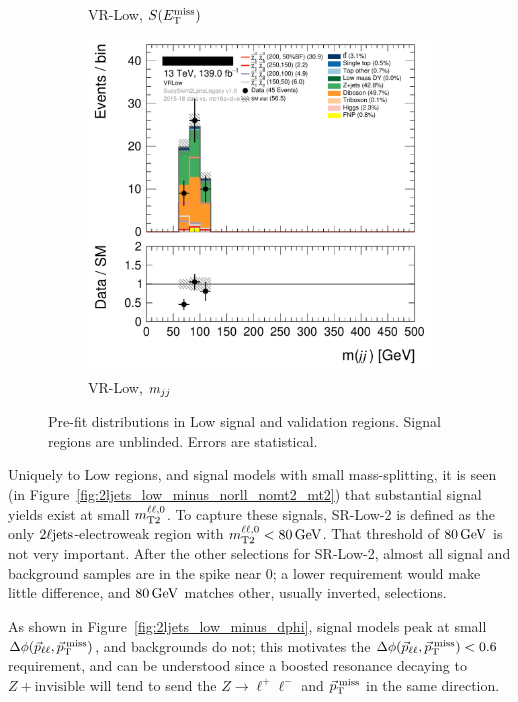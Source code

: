 \begin{figure}[tp]
\begin{subfigure}{0.48\textwidth}
\caption{VR-Low, $\metsig$}
\end{subfigure}
\hfill
\begin{subfigure}{0.48\textwidth}
\centering
\includegraphics[width=\textwidth]{figures/2ljets_def_mjj_VRLow.png}
\caption{VR-Low, $\mjj$}
\end{subfigure}
\caption[
Pre-fit distributions in Low signal and validation regions
]{%
Pre-fit distributions in Low signal and validation regions.
Signal regions are unblinded.
Errors are statistical.
}
\label{fig:2ljets_low_region}
\end{figure}

Uniquely to Low regions, and signal models with small mass-splitting, it is
seen (in Figure~\ref{fig:2ljets_low_minus_norll_nomt2_mt2}) that substantial
signal yields exist at small $\mttwoll$.
To capture these signals, SR-Low-2 is defined as the only
$\twoljets$-electroweak region with $\mttwoll < 80\,\eV[G]$.
That threshold of $80\,\eV[G]$ is not very important.
After the other selections for SR-Low-2, almost all signal and background
samples are in the spike near $0$;
a lower requirement would make little difference, and $80\,\eV[G]$ matches
other, usually inverted, selections.

As shown in Figure~\ref{fig:2ljets_low_minus_dphi}, signal models peak at small
$\dphillmet$, and backgrounds do not; this motivates the $\dphillmet < 0.6$
requirement, and can be understood since a boosted resonance decaying to
$Z+\mathrm{invisible}$ will tend to send the $Z\rightarrow \ell^+\ell^-$ and
$\ptmiss$ in the same direction.

